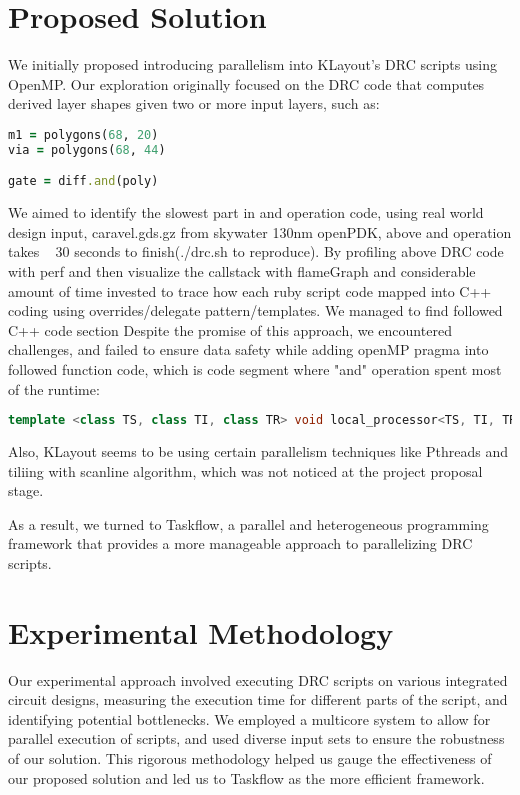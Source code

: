 \documentclass[sigconf]{acmart}
\begin{document}
  \section{Proposed Solution}
  We initially proposed introducing parallelism into KLayout's DRC scripts using OpenMP. Our exploration originally focused on the DRC code that computes derived layer shapes given two or more input layers, such as:
  \begin{lstlisting}[language=Ruby, caption=DRC code used for benchmarking in KLayout, label=lst:sample_drc_code]
m1 = polygons(68, 20)
via = polygons(68, 44)

gate = diff.and(poly)
  \end{lstlisting}
    We aimed to identify the slowest part in and operation code, using real world design input, caravel.gds.gz from skywater 130nm openPDK, above and operation takes ~ 30 seconds to finish(./drc.sh to reproduce). By profiling above DRC code with perf and then visualize the callstack with flameGraph and considerable amount of time invested to trace how each ruby script code mapped into C++ coding using overrides/delegate pattern/templates. We managed to find followed C++ code section Despite the promise of this approach, we encountered challenges, and failed to ensure data safety while adding openMP pragma into followed function code, which is code segment where "and" operation spent most of the runtime:
  
  \begin{lstlisting}[language=C++, caption=dbHierProcessor.cc,  label=code that does and DRC operation]
template <class TS, class TI, class TR> void local_processor<TS, TI, TR>::compute_local_cell (const db::local_processor_contexts<TS, TI, TR> &contexts, db::Cell *subject_cell, const db::Cell *intruder_cell, const local_operation<TS, TI, TR> *op, const typename local_processor_cell_contexts<TS, TI, TR>::context_key_type &intruders, std::vector<std::unordered_set<TR> > &result) const {/*...*/}
  \end{lstlisting}
    Also, KLayout seems to be using certain parallelism techniques like Pthreads and tiliing with scanline algorithm, which was not noticed at the project proposal stage.
    
    As a result, we turned to Taskflow, a parallel and heterogeneous programming framework that provides a more manageable approach to parallelizing DRC scripts. 
  
  \section{Experimental Methodology}
  Our experimental approach involved executing DRC scripts on various integrated circuit designs, measuring the execution time for different parts of the script, and identifying potential bottlenecks. We employed a multicore system to allow for parallel execution of scripts, and used diverse input sets to ensure the robustness of our solution. This rigorous methodology helped us gauge the effectiveness of our proposed solution and led us to Taskflow as the more efficient framework.
  
\end{document}
